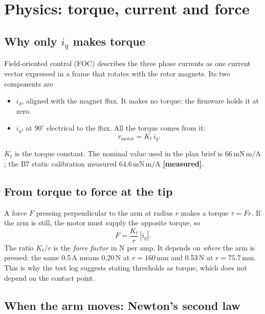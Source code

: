 \documentclass[11pt,a4paper]{article}
\newcommand{\iq}{i_q}
\newcommand{\measured}{\textcolor{teal!70!black}{\textbf{[measured]}}}
\begin{document}
\section{Physics: torque, current and force}

\subsection{Why only $\iq$ makes torque}

Field-oriented control (FOC) describes the three phase currents as one
current vector expressed in a frame that rotates with the rotor magnets.
Its two components are
\begin{itemize}
  \item $i_d$, aligned with the magnet flux. It makes no torque; the
        firmware holds it at zero.
  \item $\iq$, at $90^\circ$ electrical to the flux. All the torque comes
        from it:
        \begin{equation}
          \tau_{\mathrm{motor}} = K_t\,\iq .
          \label{eq:kt}
        \end{equation}
\end{itemize}
$K_t$ is the torque constant. The nominal value used in the plan brief is
$66\,\mathrm{mN\,m/A}$; the B7 static calibration measured
$64.6\,\mathrm{mN\,m/A}$ \measured.

\subsection{From torque to force at the tip}

A force $F$ pressing perpendicular to the arm at radius $r$ makes a torque
$\tau = F r$. If the arm is still, the motor must supply the opposite
torque, so
\begin{equation}
  F = \frac{K_t}{r}\,|\iq| .
  \label{eq:force}
\end{equation}
The ratio $K_t/r$ is the \emph{force factor} in N per amp. It depends on
\emph{where} the arm is pressed: the same 0.5\,A means 0.20\,N at
$r = 160\,\mathrm{mm}$ and 0.53\,N at $r = 75.7\,\mathrm{mm}$. This is why
the test log suggests stating thresholds as torque, which does not depend
on the contact point.

\subsection{When the arm moves: Newton's second law}
\end{document}

